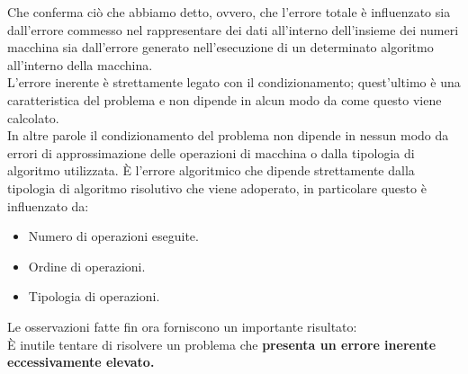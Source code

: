 \documentclass[12pt, a4paper]{book}
\theoremstyle{definition}
\begin{document}
\begin{flushleft}
Che conferma ciò che abbiamo detto, ovvero, che l'errore totale è influenzato sia dall'errore commesso nel rappresentare dei dati all'interno dell'insieme dei numeri macchina sia dall'errore generato nell'esecuzione di un determinato algoritmo all'interno della macchina.\\
\vspace{1em}
L'errore inerente è strettamente legato con il condizionamento; quest'ultimo è una caratteristica del problema e non dipende in alcun modo da come questo viene calcolato. \\
In altre parole il condizionamento del problema non dipende in nessun modo da errori di approssimazione delle operazioni di macchina o dalla tipologia di algoritmo utilizzata.
È l’errore algoritmico che dipende strettamente dalla tipologia di algoritmo risolutivo che viene adoperato, in particolare questo è influenzato da: 
\begin{itemize}
	\item Numero di operazioni eseguite.
	\item Ordine di operazioni.
	\item Tipologia di operazioni.
\end{itemize}

Le osservazioni fatte fin ora forniscono un importante risultato:\\
È inutile tentare di risolvere un problema che \textbf{presenta un errore inerente eccessivamente elevato.}
\end{flushleft}
\end{document}
